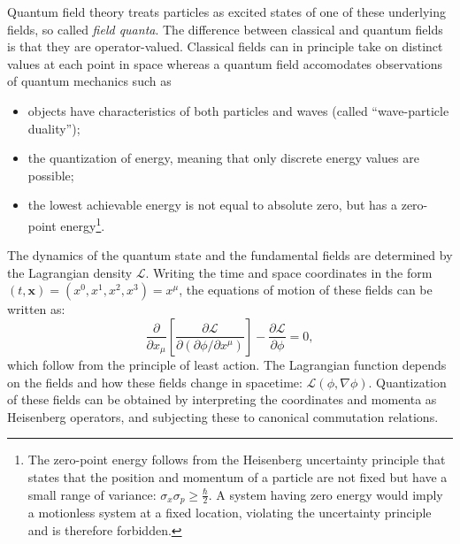 \vspace{2mm}

\noindent Quantum field theory treats particles as excited states of one of these underlying fields, so called \textit{field quanta}. The difference between classical and quantum fields is that they are operator-valued. Classical fields can in principle take on distinct values at each point in space whereas a quantum field accomodates observations of quantum mechanics such as
\vspace{2mm}
\begin{itemize}
\item objects have characteristics of both particles and waves (called ``wave-particle duality'');
\item the quantization of energy, meaning that only discrete energy values are possible;
\item the lowest achievable energy is not equal to absolute zero, but has a zero-point energy\footnote{The zero-point energy follows from the Heisenberg uncertainty principle that states that the position and momentum of a particle are not fixed but have a small range of variance: $\sigma_x\sigma_p \geq \frac{\hbar }{2}$. A system having zero energy would imply a motionless system at a fixed location, violating the uncertainty principle and is therefore forbidden.}.
\end{itemize}

\vspace{2mm}

\noindent The dynamics of the quantum state and the fundamental fields are determined by the Lagrangian density $\mathcal{L}$. Writing the time and space coordinates in the form $(t,\mathbf{x}) = (x^0, x^1, x^2, x^3) = x^\mu$, the equations of motion of these fields can be written as:
\begin{equation}
\frac{\partial}{\partial x_{\mu}}\left[\frac{\partial \mathcal{L}}{\partial\left(\partial\phi/\partial x^{\mu}\right)}\right] - \frac{\partial \mathcal{L}}{\partial \phi} = 0,
\end{equation}
which follow from the principle of least action. The Lagrangian function depends on the fields and how these fields change in spacetime: $\mathcal{L(\phi,\nabla\phi)}$. Quantization of these fields can be obtained by interpreting the coordinates and momenta as Heisenberg operators, and subjecting these to canonical commutation relations. 

